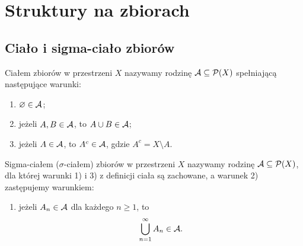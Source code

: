 \chapter{Struktury na zbiorach}
\label{chap:cialo-pierscien-przestrzen-mierzalna}

\section{Ciało i sigma-ciało zbiorów}
\label{sec:cialo-sigma-cialo}

\begin{definicja}
\label{def:cialo}
Ciałem zbiorów w przestrzeni $X$ nazywamy rodzinę $\mathcal{A}\subseteq\mathcal{P}(X)$
spełniającą następujące warunki:
\begin{enumerate}
  \item $\varnothing\in\mathcal{A}$;
  \item jeżeli $A,B\in\mathcal{A}$, to $A\cup B\in\mathcal{A}$;
  \item jeżeli $A\in\mathcal{A}$, to $A^c\in\mathcal{A}$, gdzie $A^c=X\setminus A$.
\end{enumerate}
\end{definicja}

\begin{definicja}
\label{def:sigma-cialo}
Sigma-ciałem (\mbox{$\sigma$-ciałem}) zbiorów w przestrzeni $X$ nazywamy
rodzinę $\mathcal{A}\subseteq\mathcal{P}(X)$, dla której warunki 1) i 3) z definicji
ciała są zachowane, a warunek 2) zastępujemy warunkiem:
\begin{enumerate}[label=2\textquotesingle),start=2]
  \item jeżeli $A_n\in\mathcal{A}$ dla każdego $n\geq1$, to
  \[
    \bigcup_{n=1}^{\infty}A_n\in\mathcal{A}.
  \]
\end{enumerate}
\end{definicja}
